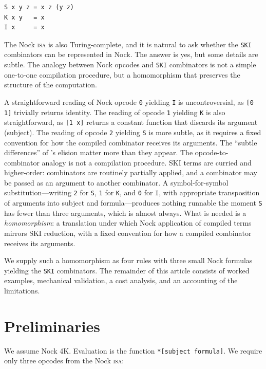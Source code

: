 \documentclass[twoside]{article}
\begin{document}
\begin{lstlisting}[style=listingblock]
S x y z = x z (y z)
K x y   = x
I x     = x
\end{lstlisting}

The Nock \textsc{isa} is also Turing-complete, and it is natural to ask whether the \texttt{SKI} combinators can be represented in Nock.  The answer is yes, but some details are subtle.  The analogy between Nock opcodes and \texttt{SKI} combinators is not a simple one-to-one compilation procedure, but a homomorphism that preserves the structure of the computation.

A straightforward reading of Nock opcode \texttt{0} yielding \texttt{I} is uncontroversial, as \lstinline[style=inlinecode]{[0 1]} trivially returns identity.  The reading of opcode \texttt{1} yielding \texttt{K} is also straightforward, as \lstinline[style=inlinecode]{[1 x]} returns a constant function that discards its argument (subject).  The reading of opcode \texttt{2} yielding \texttt{S} is more subtle, as it requires a fixed convention for how the compiled combinator receives its arguments.  The ``subtle differences'' of \citeauthor{lagrev2025}'s elision matter more than they appear.  The opcode-to-combinator analogy is not a compilation procedure. SKI terms are curried and higher-order:  combinators are routinely partially applied, and a combinator may be passed as an argument to another combinator. A symbol-for-symbol substitution---writing \texttt{2} for \texttt{S}, \texttt{1} for \texttt{K}, and \texttt{0} for \texttt{I}, with appropriate transposition of arguments into subject and formula---produces nothing runnable the moment \texttt{S} has fewer than three arguments, which is almost always.  What is needed is a \emph{homomorphism}: a translation under which Nock application of compiled terms mirrors SKI reduction, with a fixed convention for how a compiled combinator receives its arguments.

We supply such a homomorphism as four rules with three small Nock formulas yielding the \texttt{SKI} combinators.  The remainder of this article consists of worked examples, mechanical validation, a cost analysis, and an accounting of the limitations.

\section{Preliminaries}
\label{sxn:preliminaries}

We assume Nock 4K. Evaluation is the function \lstinline[style=inlinecode]{*[subject formula]}.  We require only three opcodes from the Nock \textsc{isa}:
\end{document}
